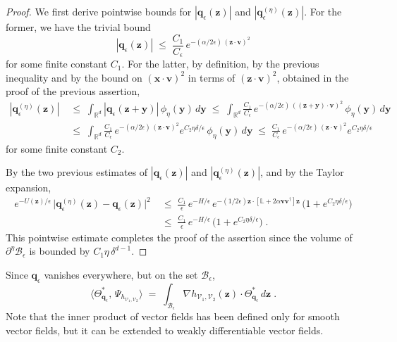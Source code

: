\documentclass[reqno]{amsart}
\newcounter{as}[section]
\newcommand{\mc}[1]{{\mathcal #1}}
\newcommand{\bb}[1]{{\mathbb #1}}
\newcommand{\bs}[1]{{\boldsymbol #1}}
\newcommand{\<}{\langle}
\renewcommand{\>}{\rangle}
\begin{document}
\begin{proof}
We first derive pointwise bounds for $|\bs{q}_{\epsilon}(\bs{z})|$
and $|\bs{q}_{\epsilon}^{(\eta)}(\bs{z})|$. For the former, we have
the trivial bound
\begin{equation}
\label{se41}
|\bs{q}_{\epsilon}(\bs{z})| \;\le\; \frac{C_1}{C_{\epsilon}}\,
e^{- (\alpha/2\epsilon)\, (\bs{z}\cdot\bs{v})^{2}}
\end{equation}
for some finite constant $C_1$.  For the latter, by definition, by the
previous inequality and by the bound on $(\bs{x}\cdot\bs{v})^{2}$ in
terms of $(\bs{z}\cdot\bs{v})^{2}$, obtained in the proof of the
previous assertion,
\begin{align*}
|\bs{q}_{\epsilon}^{(\eta)}(\bs{z})|
\; &\le\;\int_{\bb{R}^{d}} |\bs{q}_{\epsilon}(\bs{z}+\bs{y})|
\, \phi_{\eta}(\bs{y})\, d\bs{y}
\;\le\;\int_{\bb{R}^{d}}  \frac{C_1}{C_{\epsilon}}
\, e^{- (\alpha/2\epsilon)\, ((\bs{z}+\bs{y})\cdot\bs{v})^{2}} \,
\phi_{\eta}(\bs{y}) \, d\bs{y} \\
\; &\le\; \int_{\bb{R}^{d}} \frac{C_1}{C_{\epsilon}} \,
e^{- (\alpha/2\epsilon)\, (\bs{z}\cdot\bs{v})^{2}}
e^{C_2 \eta\delta/\epsilon}
\, \phi_{\eta}(\bs{y})\, d\bs{y}
\;\le\; \frac{C_1}{C_{\epsilon}} \,
e^{- (\alpha/2\epsilon)\, (\bs{z}\cdot\bs{v})^{2}}
e^{C_2 \eta\delta/\epsilon}
\end{align*}
for some finite constant $C_2$.

By the two previous estimates of $|\bs{q}_{\epsilon}(\bs{z})|$ and
$|\bs{q}_{\epsilon}^{(\eta)}(\bs{z})|$, and by the Taylor expansion,
\begin{align*}
e^{-U(\bs{z})/\epsilon} \, \big|\bs{q}_{\epsilon}^{(\eta)}(\bs{z})
-\bs{q}_{\epsilon}(\bs{z})\big|^{2} \; & \le\;
\frac{C_1}{\epsilon}\, e^{-H/\epsilon} \, e^{-(1/2\epsilon)\bs{z}\cdot
[\bb{L}+2\alpha\bs{v}\bs{v}^{\dagger}]\bs{z}} \,
\Big( 1+e^{C_2 \eta\delta/\epsilon} \Big) \\
\; & \le\; \frac{C_1}{\epsilon}\, e^{-H/\epsilon} \,
\Big( 1+e^{C_2 \eta\delta/\epsilon} \Big)\;.
\end{align*}
This pointwise estimate completes the proof of the assertion since the
volume of $\partial^{\eta}\mc{B}_{\epsilon}$ is bounded by
$C_1\eta\, \delta^{d-1}$.
\end{proof}

 Since $\bs{q}_{\epsilon}$
vanishes everywhere, but on the set $\mc{B}_{\epsilon}$,
\begin{equation*}
\big\langle \Theta_{\bs{q}_{\epsilon}}^{*} ,\,
\Psi_{h_{\mc{V}_{1},\mc{V}_{2}}}\big\rangle \;=\;
\int_{\mc{B}_{\epsilon}} \nabla h_{\mc{V}_{1},\mc{V}_{2}}(\bs{z})
\cdot\Theta_{\bs{q}_{\epsilon}}^{*}\, d \bs{z}\;.
\end{equation*}
Note that the inner product of vector fields has been defined only for
smooth vector fields, but it can be extended to weakly
differentiable vector fields.
\end{document}
